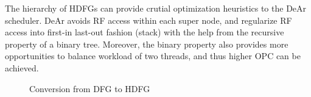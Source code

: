             \indent The hierarchy of HDFGs can provide crutial optimization heuristics to the DeAr scheduler.
            DeAr avoids RF access within each super node, and regularize RF access into first-in last-out fashion (stack) with the help from the recursive property of a binary tree.
            Moreover, the binary property also provides more opportunities to balance workload of two threads, and thus higher OPC can be achieved.
\begin{figure}[!ht]
    \begin{center}
    \end{center}
    \caption{Conversion from DFG to HDFG}
    \label{fig:dfg}
\end{figure}

        
